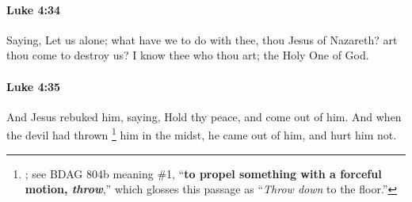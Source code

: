 		\paragraph{Luke 4:34} %
			\label{LUKE-4-34}

			Saying, Let us alone; what have we to do with thee, thou Jesus of Nazareth? art thou come to destroy us? I know thee who thou art; the Holy One of God.

			\begin{framed}
			\scriptsize
				\begin{compactdesc}
					\item[SBLG] 
				\end{compactdesc}
			\end{framed}

		\paragraph{Luke 4:35} %
			\label{LUKE-4-35}

			And Jesus rebuked him, saying, Hold thy peace, and come out of him. And when the devil had thrown%
				\footnote{%
					; see BDAG 804b meaning \#1, ``\textbf{to propel something with a forceful motion, \textit{throw}},'' which glosses this passage as ``\textit{Throw down} to the floor.''
					}
			him in the midst, he came out of him, and hurt him not.

